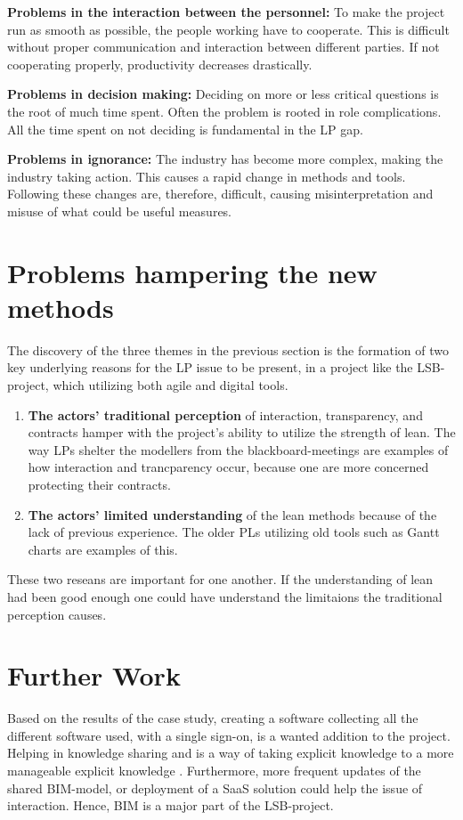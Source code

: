{\bf Problems in the interaction between the personnel:} To make the project run as smooth as possible, the people working have to cooperate. This is difficult without proper communication and interaction between different parties. If not cooperating properly, productivity decreases drastically.

{\bf Problems in decision making:} Deciding on more or less critical questions is the root of much time spent. Often the problem is rooted in role complications. All the time spent on not deciding is fundamental in the LP gap.

{\bf Problems in ignorance:} The industry has become more complex, making the industry taking action. This causes a rapid change in methods and tools. Following these changes are, therefore, difficult, causing misinterpretation and misuse of what could be useful measures.

\section{Problems hampering the new methods} \label{sec:rq2}
The discovery of the three themes in the previous section is the formation of two key underlying reasons for the LP issue to be present, in a project like the LSB-project, which utilizing both agile and digital tools. 

\begin{enumerate}
    \item { \bf The actors' traditional perception} of interaction, transparency, and contracts hamper with the project's ability to utilize the strength of lean. The way LPs shelter the modellers from the blackboard-meetings are examples of how interaction and trancparency occur, because one are more concerned protecting their contracts.
    \item { \bf The actors' limited understanding} of the lean methods because of the lack of previous experience. The older PLs utilizing old tools such as Gantt charts are examples of this. 
\end{enumerate}

These two reseans are important for one another. If the understanding of lean had been good enough one could have understand the limitaions the traditional perception causes.

\section{Further Work} \label{sec:further_research}
Based on the results of the case study, creating a software collecting all the different software used, with a single sign-on, is a wanted addition to the project. Helping in knowledge sharing and is a way of taking explicit knowledge to a more manageable explicit knowledge \cite{star&griesemer}. Furthermore, more frequent updates of the shared BIM-model, or deployment of a SaaS solution could help the issue of interaction. Hence, BIM is a major part of the LSB-project.

